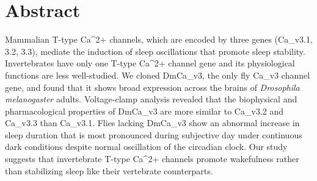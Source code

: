\section*{Abstract}
Mammalian T-type Ca^{2+} channels, which are encoded by three genes (Ca_{v}3.1, 3.2, 3.3), mediate the induction of sleep oscillations that promote sleep stability.
Invertebrates have only one T-type Ca^{2+} channel gene and its physiological functions are less well-studied.
We cloned DmCa_{v}3, the only fly Ca_{v}3 channel gene, and found that it shows broad expression across the brains of \emph{Drosophila melanogaster} adults.
Voltage-clamp analysis revealed that the biophysical and pharmacological properties of DmCa_{v}3 are more similar to Ca_{v}3.2 and Ca_{v}3.3 than Ca_{v}3.1.
Flies lacking DmCa_{v}3 show an abnormal increase in sleep duration that is most pronounced during subjective day under continuous dark conditions despite normal oscillation of the circadian clock.
Our study suggests that invertebrate T-type Ca^{2+} channels promote wakefulness rather than stabilizing sleep like their vertebrate counterparts.
